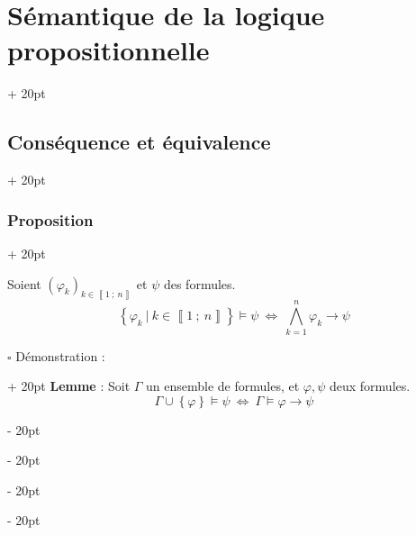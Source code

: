 \documentclass[a4paper, 12pt, twoside]{article}
\newcommand{\nset}[2]{\left\llbracket #1\ ;\ #2 \right\rrbracket}
\newcommand{\set}[1]{\left\{ #1 \right\}}
\newcommand{\ssi}{\ \Leftrightarrow \ }
\newcommand{\ind}[1][20pt]{\advance\leftskip + #1}
\newcommand{\deind}[1][20pt]{\advance\leftskip - #1}
\newenvironment{indt}[2][20pt]{#2 \par \ind[#1]}{\par \deind} %
\begin{document}
\begin{indt}{\section{Sémantique de la logique propositionnelle}}
\begin{indt}{\subsection{Conséquence et équivalence}}
            \vspace{12pt}
            
            \begin{indt}{\subsubsection{Proposition}}
                \begin{pseudocode}
                    Soient $(\varphi_k)_{k \in \nset 1 n}$ et $\psi$ des formules.
                        \[ \set{\varphi_k\ |\ k \in \nset 1 n} \vDash \psi \ssi \bigwedge_{k = 1}^n \varphi_k \rightarrow \psi \]
                \end{pseudocode}
                
                \begin{indt}{$\square$ Démonstration :}
                    \textbf{Lemme} : Soit $\Gamma$ un ensemble de formules, et $\varphi, \psi$ deux formules.
                        \[ \Gamma \cup \set \varphi \vDash \psi \ssi \Gamma \vDash \varphi \rightarrow \psi \]
                    

\end{indt}
\end{indt}
\end{indt}
\end{indt}
\end{document}
